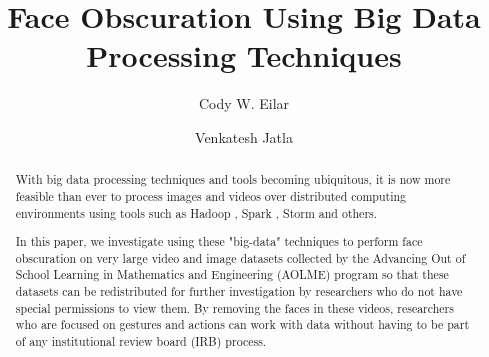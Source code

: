 \documentclass[
	submission,
	final,
	notitlepage,
	narroweqnarray,
	inline,
	twoside,
	]{ieee}
\begin{document}
\title{Face Obscuration Using Big Data Processing Techniques}

\author[EILAR AND VENKATESH]{Cody W. Eilar
       \and{} Venkatesh Jatla 
}


\maketitle               

\begin{abstract} 
  With big data processing techniques and tools becoming ubiquitous, it
  is now more feasible than ever to process images and videos over 
  distributed computing environments using tools such as Hadoop \cite{hadoop}, Spark \cite{spark}, Storm \cite{storm} and others. 

  In this paper, we investigate 
  using these "big-data" techniques to perform face obscuration on very large
  video and image datasets collected by the Advancing Out of School Learning in 
  Mathematics and Engineering (AOLME) program so that these datasets can be redistributed for further
  investigation by researchers who do not have special permissions to view 
  them. By removing the faces in these videos, researchers who are focused
  on gestures and actions can work with data without having to be 
  part of any institutional review board (IRB) process.  
\end{abstract}
\end{document}
